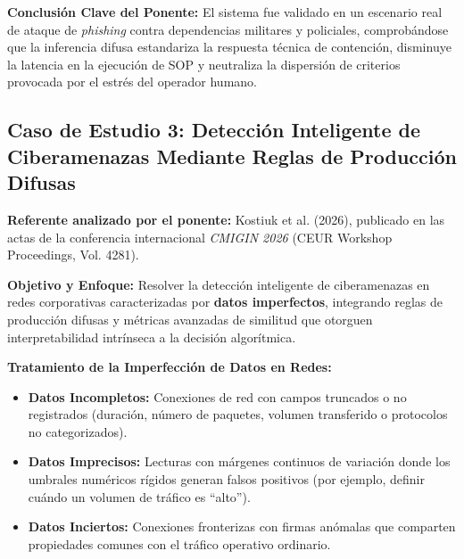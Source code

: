 \documentclass[12pt,a4paper]{article}
\begin{document}
\textbf{Conclusión Clave del Ponente:} El sistema fue validado en un escenario real de ataque de \textit{phishing} contra dependencias militares y policiales, comprobándose que la inferencia difusa estandariza la respuesta técnica de contención, disminuye la latencia en la ejecución de SOP y neutraliza la dispersión de criterios provocada por el estrés del operador humano.

\subsection*{Caso de Estudio 3: Detección Inteligente de Ciberamenazas Mediante Reglas de Producción Difusas}
\noindent\textbf{Referente analizado por el ponente:} Kostiuk et al. (2026), publicado en las actas de la conferencia internacional \textit{CMIGIN 2026} (CEUR Workshop Proceedings, Vol. 4281).

\textbf{Objetivo y Enfoque:} Resolver la detección inteligente de ciberamenazas en redes corporativas caracterizadas por \textbf{datos imperfectos}, integrando reglas de producción difusas y métricas avanzadas de similitud que otorguen interpretabilidad intrínseca a la decisión algorítmica.

\textbf{Tratamiento de la Imperfección de Datos en Redes:}
\begin{itemize}
    \item \textbf{Datos Incompletos:} Conexiones de red con campos truncados o no registrados (duración, número de paquetes, volumen transferido o protocolos no categorizados).
    \item \textbf{Datos Imprecisos:} Lecturas con márgenes continuos de variación donde los umbrales numéricos rígidos generan falsos positivos (por ejemplo, definir cuándo un volumen de tráfico es ``alto'').
    \item \textbf{Datos Inciertos:} Conexiones fronterizas con firmas anómalas que comparten propiedades comunes con el tráfico operativo ordinario.
\end{itemize}
\end{document}
